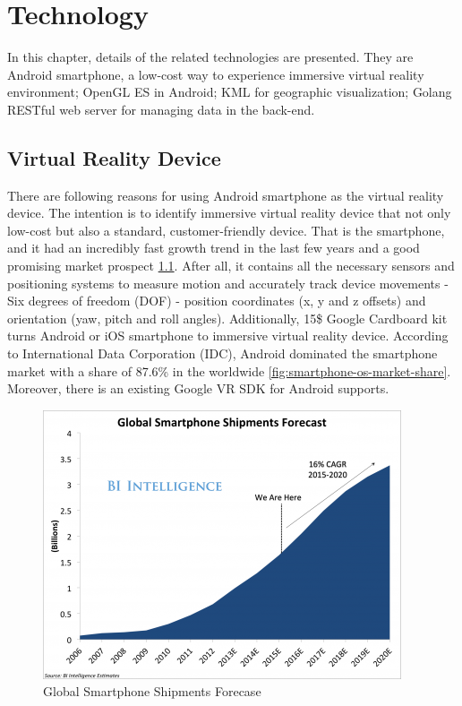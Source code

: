 \label{chapter-technology}
\chapter{Technology}

In this chapter, details of the related technologies are presented. They are Android smartphone, a low-cost way to experience immersive virtual reality environment; OpenGL ES in Android; KML for geographic visualization; Golang RESTful web server for managing data in the back-end.

\section{Virtual Reality Device}

There are following reasons for using Android smartphone as the virtual reality device. The intention is to identify immersive virtual reality device that not only low-cost but also a standard, customer-friendly device. That is the smartphone, and it had an incredibly fast growth trend in the last few years and a good promising market prospect \ref{fig:smartphone-shipments-forecast}. After all, it contains all the necessary sensors and positioning systems to measure motion and accurately track device movements - Six degrees of freedom (DOF) - position coordinates (x, y and z offsets) and orientation (yaw, pitch and roll angles). Additionally, 15\$ Google Cardboard kit turns Android or iOS smartphone to immersive virtual reality device. According to International Data Corporation (IDC), Android dominated the smartphone market with a share of 87.6\% in the worldwide \ref{fig:smartphone-os-market-share}. Moreover, there is an existing Google VR SDK \cite{google.vr-sdk.2016} for Android supports.

\begin{figure}[H]
\caption[Global Smartphone Shipments Forecase]{Global Smartphone Shipments Forecase \cite{tony.global-smartphone-market.2015}}
\label{fig:smartphone-shipments-forecast}
\centering
\includegraphics[]{Figures/smartphone-shipments-forecast.png}
\decoRule
\end{figure}

